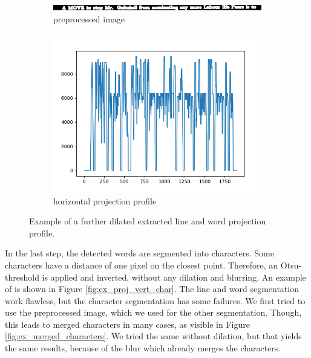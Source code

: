 \documentclass[english, paper=a4]{scrartcl}
\begin{document}
\begin{figure}
	\centering
	\begin{subfigure}{0.40\textwidth}
		\includegraphics[width=\textwidth]{PreprocessedLine.PNG}
		\caption{preprocessed image}
		\label{fig:ex2a}
	\end{subfigure}
	\begin{subfigure}{0.40\textwidth}
		\includegraphics[width=\textwidth]{VertProjectionWord.PNG}
		\caption{horizontal projection profile}
		\label{fig:ex2b}
	\end{subfigure}
	\caption{Example of a further dilated extracted line and word projection profile.}
	\label{fig:ex_proj_vert}
\end{figure}

In the last step, the detected words are segmented into characters. Some characters have a distance of one pixel on the closest point. Therefore, an Otsu-threshold is applied and inverted, without any dilation and blurring. 
An example of is shown in Figure \ref{fig:ex_proj_vert_char}.
The line and word segmentation work flawless, but the character segmentation has some failures.
We first tried to use the preprocessed image, which we used for the other segmentation.
Though, this leads to merged characters in many cases, as visible in Figure \ref{fig:ex_merged_characters}.
We tried the same without dilation, but that yields the same results, because of the blur which already merges the characters.
\end{document}
